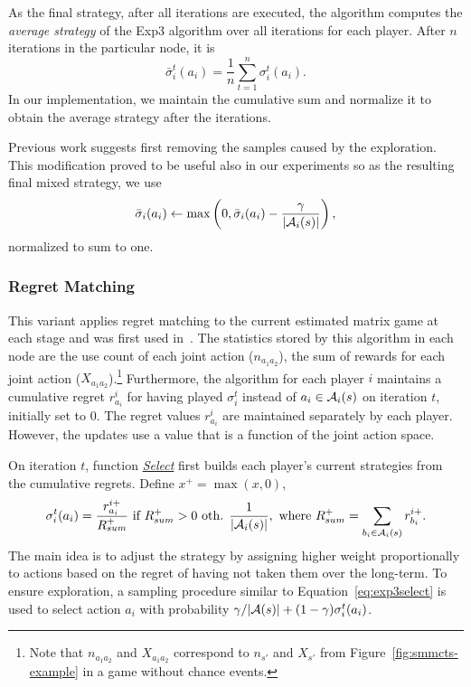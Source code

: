 As the final strategy, after all iterations are executed, the algorithm computes the \emph{average strategy} of the Exp3 algorithm over all iterations for each player. After $n$ iterations in the particular node, it is
\begin{equation}
\bar{\sigma}^t_i(a_i) = \frac{1}{n}\sum_{t=1}^n \sigma^t_i(a_i).
\end{equation}
In our implementation, we maintain the cumulative sum and normalize it to obtain the average strategy after the iterations.

Previous work \cite{Teytaud11Upper} suggests first removing the samples caused by the exploration.
This modification proved to be useful also in our experiments
so as the resulting final mixed strategy, we use
\begin{equation}
\bar{\sigma}_i(a_i) \leftarrow \max\left(0, \bar{\sigma}_i(a_i) - \frac{\gamma}{|\mathcal{A}_i(s)|}\right),
\end{equation}
normalized to sum to one.

\subsubsection{Regret Matching} \label{sec:rm}

This variant applies regret matching \cite{Hart00} to the current estimated matrix game at each stage and was first used in~\cite{Lanctot13Goofspiel}. The statistics stored by this algorithm in each node are the use count of each joint action ($n_{a_1a_2}$), the sum of rewards for each joint action ($X_{a_1a_2}$).\footnote{Note that $n_{a_1a_2}$ and $X_{a_1a_2}$ correspond to $n_{s'}$ and $X_{s'}$ from Figure~\ref{fig:smmcts-example} in a game without chance events.}
Furthermore, the algorithm for each player $i$ maintains a cumulative regret $r^i_{a_i}$ for having played $\sigma_i^t$ instead of $a_i \in \mathcal{A}_i(s)$ on iteration $t$, initially set to 0. The regret values $r^i_{a_i}$ are maintained separately by each player. However, the updates use a value that is a function of the joint action space. 

On iteration $t$, function \emph{\underline{Select}} first builds
each player's current strategies from the cumulative regrets. Define $x^+ = \max(x,0)$,
\begin{equation}
\label{eq:rm}
\sigma^t_i(a_i) = \frac{r^{i+}_{a_i}}{R^+_{sum}} \mbox{ if } R^+_{sum} > 0 
\mbox{ oth. } \frac{1}{|\mathcal{A}_i(s)|}, \mbox{ where } R^+_{sum} = \sum_{b_i \in \mathcal{A}_i(s)}{r^{i+}_{b_i}}.
\end{equation}
The main idea is to adjust the strategy by assigning higher weight proportionally to actions based on the regret of having not taken them over the long-term.
To ensure exploration, a sampling procedure similar to Equation~\ref{eq:exp3select} is used to select action $a_i$ with probability 
$\gamma/|\mathcal{A}(s)| + (1-\gamma) \sigma^t_i(a_i)$.

